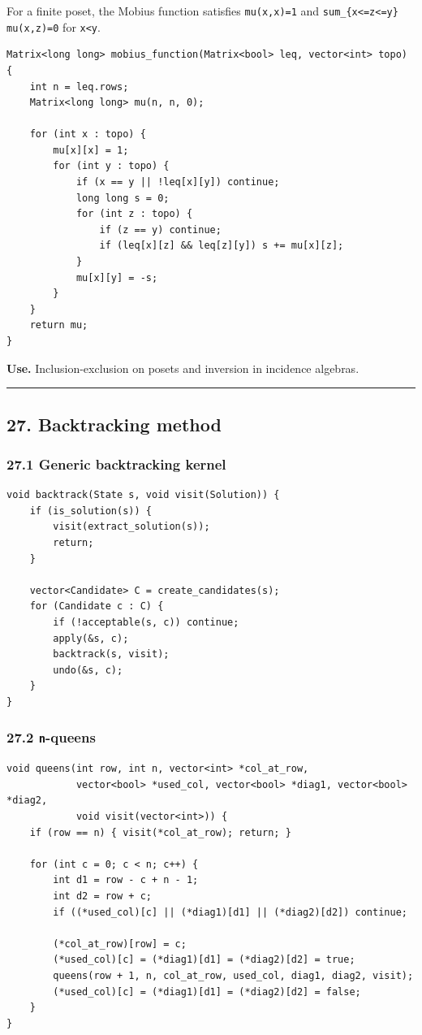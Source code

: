 \documentclass[11pt]{article}
\begin{document}
For a finite poset, the Mobius function satisfies \texttt{mu(x,x)=1} and \texttt{sum\_\{x<=z<=y\} mu(x,z)=0} for \texttt{x<y}.

\begin{verbatim}
Matrix<long long> mobius_function(Matrix<bool> leq, vector<int> topo) {
    int n = leq.rows;
    Matrix<long long> mu(n, n, 0);

    for (int x : topo) {
        mu[x][x] = 1;
        for (int y : topo) {
            if (x == y || !leq[x][y]) continue;
            long long s = 0;
            for (int z : topo) {
                if (z == y) continue;
                if (leq[x][z] && leq[z][y]) s += mu[x][z];
            }
            mu[x][y] = -s;
        }
    }
    return mu;
}
\end{verbatim}

\textbf{Use.} Inclusion-exclusion on posets and inversion in incidence algebras.

\begin{center}\rule{0.5\linewidth}{0.5pt}\end{center}

\subsection{27. Backtracking method}\label{backtracking-method}

\subsubsection{27.1 Generic backtracking kernel}\label{generic-backtracking-kernel}

\begin{verbatim}
void backtrack(State s, void visit(Solution)) {
    if (is_solution(s)) {
        visit(extract_solution(s));
        return;
    }

    vector<Candidate> C = create_candidates(s);
    for (Candidate c : C) {
        if (!acceptable(s, c)) continue;
        apply(&s, c);
        backtrack(s, visit);
        undo(&s, c);
    }
}
\end{verbatim}

\subsubsection{\texorpdfstring{27.2 \texttt{n}-queens}{27.2 n-queens}}\label{n-queens}

\begin{verbatim}
void queens(int row, int n, vector<int> *col_at_row,
            vector<bool> *used_col, vector<bool> *diag1, vector<bool> *diag2,
            void visit(vector<int>)) {
    if (row == n) { visit(*col_at_row); return; }

    for (int c = 0; c < n; c++) {
        int d1 = row - c + n - 1;
        int d2 = row + c;
        if ((*used_col)[c] || (*diag1)[d1] || (*diag2)[d2]) continue;

        (*col_at_row)[row] = c;
        (*used_col)[c] = (*diag1)[d1] = (*diag2)[d2] = true;
        queens(row + 1, n, col_at_row, used_col, diag1, diag2, visit);
        (*used_col)[c] = (*diag1)[d1] = (*diag2)[d2] = false;
    }
}
\end{verbatim}
\end{document}
